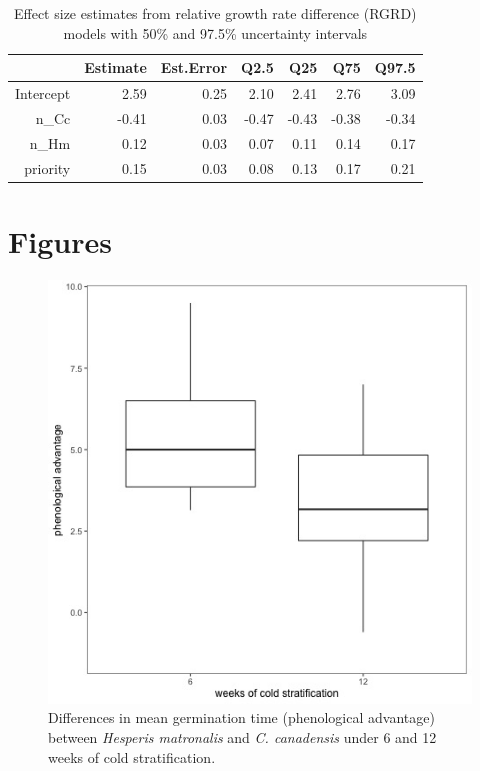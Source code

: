 \documentclass{article}
\begin{document}
\begin{table}[hp]
\centering
\begin{tabular}{rrrrrrr}
  \hline
 & Estimate & Est.Error & Q2.5 & Q25 & Q75 & Q97.5 \\ 
  \hline
Intercept & 2.59 & 0.25 & 2.10 & 2.41 & 2.76 & 3.09 \\ 
  n\_Cc & -0.41 & 0.03 & -0.47 & -0.43 & -0.38 & -0.34 \\ 
  n\_Hm & 0.12 & 0.03 & 0.07 & 0.11 & 0.14 & 0.17 \\ 
  priority & 0.15 & 0.03 & 0.08 & 0.13 & 0.17 & 0.21 \\ 
   \hline
\end{tabular}
\caption{Effect size estimates from relative growth rate difference (RGRD) models with 50\% and 97.5\% uncertainty intervals}
\label{tab:RGRD}
\end{table}

\pagebreak
\section*{Figures}

\begin{figure}[hp]
    \centering
\includegraphics[width=.7\textwidth]{..//figure/priority_treat.jpeg}
   \caption{Differences in mean germination time (phenological advantage) between \textit{Hesperis matronalis} and \textit{C. canadensis} under 6 and 12 weeks of cold stratification.} 
   \label{fig:MGTsup}
\end{figure}
\end{document}
